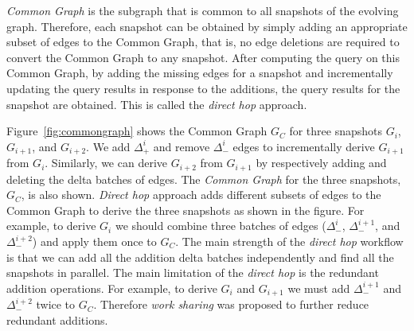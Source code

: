 \emph{Common Graph} is the subgraph that is common to all snapshots of the evolving graph. Therefore, each snapshot can be obtained by simply adding an appropriate subset of edges to the Common Graph, that is, no edge deletions are required to convert the Common Graph to any snapshot. After computing the query on this Common Graph, by adding the missing edges for a snapshot and incrementally updating the query results in response to the additions, the query results for the snapshot are obtained. This is called the \emph{direct hop} approach. %

Figure~\ref{fig:commongraph} shows the Common Graph $G_{C}$ for three snapshots $G_i$, $G_{i+1}$, and $G_{i+2}$. We add $\Delta_{+}^{i}$ and remove $\Delta_{-}^{i}$ edges to incrementally derive $G_{i+1}$ from $G_i$. Similarly, we can derive $G_{i+2}$ from $G_{i+1}$ by respectively adding and deleting the delta batches of edges. The \emph{Common Graph} for the three snapshots, $G_{C}$, is also shown. \emph{Direct hop} approach adds different subsets of edges to the Common Graph to derive the three snapshots as shown in the figure.  For example, to derive $G_i$ we should combine three batches of edges ($\Delta_{-}^{i}$, $\Delta_{-}^{i+1}$, and $\Delta_{-}^{i+2}$) and apply them once to $G_{C}$. The main strength of the \emph{direct hop} workflow is that we can add all the addition delta batches independently and find all the snapshots in parallel. The main limitation of the \emph{direct hop} is the redundant addition operations. For example, to derive $G_i$ and $G_{i+1}$ we must add $\Delta_{-}^{i+1}$ and $\Delta_{-}^{i+2}$ twice to $G_C$. Therefore \emph{work sharing} was proposed to further reduce redundant additions. 

\iffalse
\begin{figure}[!t]
    \centering
    \texttt{[image: diagrams/Time\_Increase\_with\_Size.pdf]}
    \vspace{-0.15in}
    \caption{Incremental SSSP execution time for a RMAT graph with increasing size on a 75K batch of edge additions.}
    \label{fig:incremental_time}
\vspace{-0.15in}
\end{figure}
\fi

